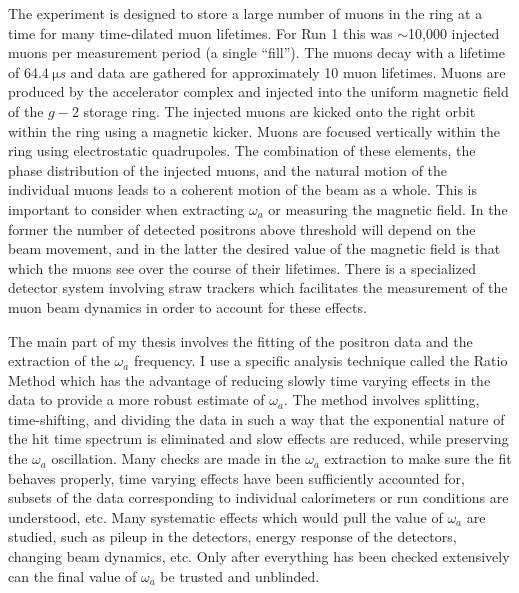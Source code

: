 \documentclass[12pt,letterpaper]{article}
\def\wa{$\omega_{a}$\xspace}
\def\gmtwo{$g-2$\xspace}
\begin{document}
The experiment is designed to store a large number of muons in the ring at a time for many time-dilated muon lifetimes. For Run 1 this was $\sim$10,000 injected muons per measurement period (a single ``fill''). The muons decay with a lifetime of $\SI{64.4}{\micro s}$ and data are gathered for approximately 10 muon lifetimes. Muons are produced by the accelerator complex and injected into the uniform magnetic field of the \gmtwo storage ring. The injected muons are kicked onto the right orbit within the ring using a magnetic kicker. Muons are focused vertically within the ring using electrostatic quadrupoles. The combination of these elements, the phase distribution of the injected muons, and the natural motion of the individual muons leads to a coherent motion of the beam as a whole. This is important to consider when extracting \wa or measuring the magnetic field. In the former the number of detected positrons above threshold will depend on the beam movement, and in the latter the desired value of the magnetic field is that which the muons see over the course of their lifetimes. There is a specialized detector system involving straw trackers which facilitates the measurement of the muon beam dynamics in order to account for these effects.


The main part of my thesis involves the fitting of the positron data and the extraction of the \wa frequency. I use a specific analysis technique called the Ratio Method which has the advantage of reducing slowly time varying effects in the data to provide a more robust estimate of \wa. The method involves splitting, time-shifting, and dividing the data in such a way that the exponential nature of the hit time spectrum is eliminated and slow effects are reduced, while preserving the \wa oscillation. Many checks are made in the \wa extraction to make sure the fit behaves properly, time varying effects have been sufficiently accounted for, subsets of the data corresponding to individual calorimeters or run conditions are understood, etc. Many systematic effects which would pull the value of \wa are studied, such as pileup in the detectors, energy response of the detectors, changing beam dynamics, etc. Only after everything has been checked extensively can the final value of \wa be trusted and unblinded. 
\end{document}
